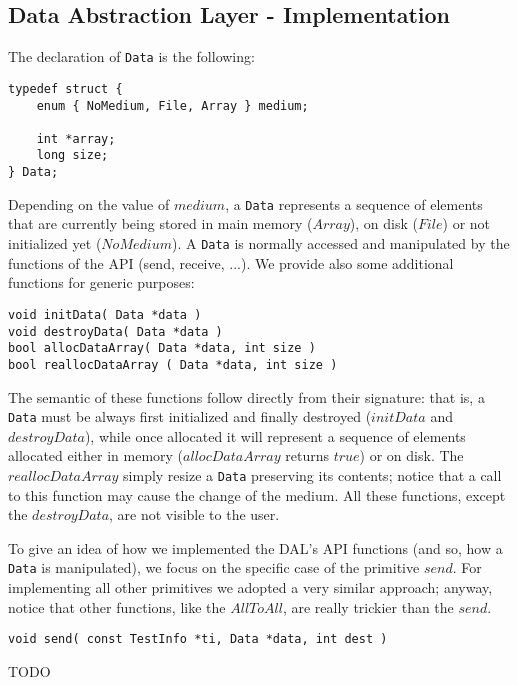 \subsection*{Data Abstraction Layer - Implementation}
The declaration of \texttt{Data} is the following:
\begin{lstlisting}
typedef struct {
	enum { NoMedium, File, Array } medium;

	int *array;
	long size;
} Data;
\end{lstlisting}
Depending on the value of $medium$, a \texttt{Data} represents a sequence of elements that are currently being stored in main memory ($Array$), on disk ($File$) or not initialized yet ($NoMedium$). A \texttt{Data} is normally accessed and manipulated by the functions of the API (send, receive, ...). We provide also some additional functions for generic purposes: 
\begin{lstlisting}
void initData( Data *data )
void destroyData( Data *data )
bool allocDataArray( Data *data, int size )
bool reallocDataArray ( Data *data, int size )
\end{lstlisting}
The semantic of these functions follow directly from their signature: that is, a \texttt{Data} must be always first initialized and finally destroyed ($initData$ and $destroyData$), while once allocated it will represent a sequence of elements allocated either in memory ($allocDataArray$ returns $true$) or on disk. The $reallocDataArray$ simply resize a \texttt{Data} preserving its contents; notice that a call to this function may cause the change of the medium. All these functions, except the $destroyData$, are not visible to the user.

To give an idea of how we implemented the DAL's API functions (and so, how a \texttt{Data} is manipulated), we focus on the specific case of the primitive $send$. For implementing all other primitives we adopted a very similar approach; anyway, notice that other functions, like the $AllToAll$, are really trickier than the $send$. 
\begin{lstlisting}
void send( const TestInfo *ti, Data *data, int dest )
\end{lstlisting}
TODO


